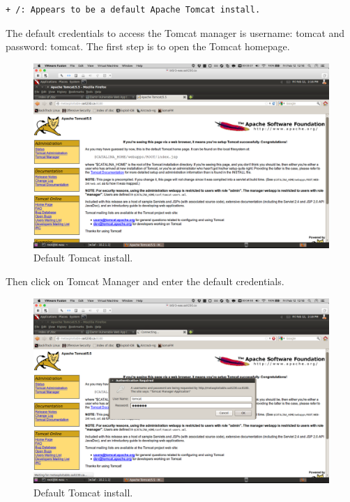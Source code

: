 \documentclass{article}
\begin{document}
\begin{lstlisting}
+ /: Appears to be a default Apache Tomcat install.
\end{lstlisting}

The default credentials to access the Tomcat manager is username: tomcat and password: tomcat.
The first step is to open the Tomcat homepage.

\begin{figure}[h!]
	\includegraphics[width=\linewidth]{images/tomcat-metasploitable.png}
	\caption{Default Tomcat install.}
	\label{fig:tomcat-injection1}
\end{figure}

\newpage
Then click on Tomcat Manager and enter the default credentials.

\begin{figure}[h!]
	\includegraphics[width=\linewidth]{images/tomcat-metasploitable-credentials.png}
	\caption{Default Tomcat install.}
	\label{fig:tomcat-injection2}
\end{figure}
\end{document}
